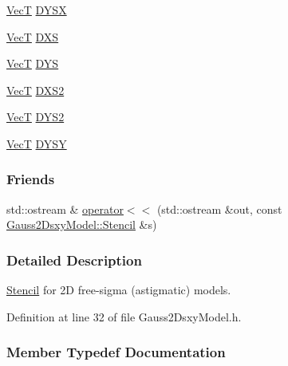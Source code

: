 \begin{DoxyCompactItemize}
\item 
\hyperlink{namespacemappel_a2225ad69f358daa3f4f99282a35b9a3a}{VecT} \hyperlink{classmappel_1_1Gauss2DsxyModel_1_1Stencil_a50f6788036ea6e998a949abb9d7005b5}{D\+Y\+SX}
\item 
\hyperlink{namespacemappel_a2225ad69f358daa3f4f99282a35b9a3a}{VecT} \hyperlink{classmappel_1_1Gauss2DsxyModel_1_1Stencil_a2b06cb49a3299c8b812248f3b1dabf38}{D\+XS}
\item 
\hyperlink{namespacemappel_a2225ad69f358daa3f4f99282a35b9a3a}{VecT} \hyperlink{classmappel_1_1Gauss2DsxyModel_1_1Stencil_a031aaa5d34ba2d3bcb9c553554660b9e}{D\+YS}
\item 
\hyperlink{namespacemappel_a2225ad69f358daa3f4f99282a35b9a3a}{VecT} \hyperlink{classmappel_1_1Gauss2DsxyModel_1_1Stencil_afe5bef8195ec8088dbb886220ac0a558}{D\+X\+S2}
\item 
\hyperlink{namespacemappel_a2225ad69f358daa3f4f99282a35b9a3a}{VecT} \hyperlink{classmappel_1_1Gauss2DsxyModel_1_1Stencil_aee79b44ae51dc400aa2074e88662fed9}{D\+Y\+S2}
\item 
\hyperlink{namespacemappel_a2225ad69f358daa3f4f99282a35b9a3a}{VecT} \hyperlink{classmappel_1_1Gauss2DsxyModel_1_1Stencil_a05f0b12a92c999f882fd9120680287c7}{D\+Y\+SY}
\end{DoxyCompactItemize}
\subsubsection*{Friends}
\begin{DoxyCompactItemize}
\item 
std\+::ostream \& \hyperlink{classmappel_1_1Gauss2DsxyModel_1_1Stencil_a0f83ea37a779cc66a2db24ccdce62451}{operator$<$$<$} (std\+::ostream \&out, const \hyperlink{classmappel_1_1Gauss2DsxyModel_1_1Stencil}{Gauss2\+Dsxy\+Model\+::\+Stencil} \&s)
\end{DoxyCompactItemize}


\subsubsection{Detailed Description}
\hyperlink{classmappel_1_1Gauss2DsxyModel_1_1Stencil}{Stencil} for 2D free-\/sigma (astigmatic) models. 

Definition at line 32 of file Gauss2\+Dsxy\+Model.\+h.



\subsubsection{Member Typedef Documentation}
